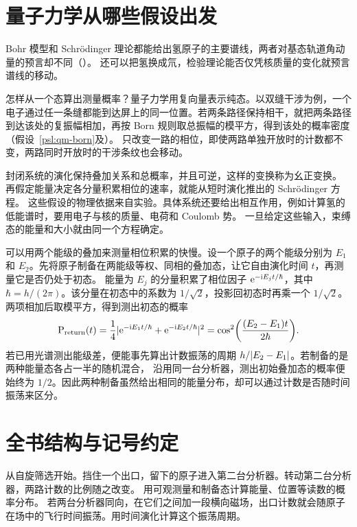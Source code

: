 \section{量子力学从哪些假设出发}
Bohr 模型和 Schrödinger 理论都能给出氢原子的主要谱线，两者对基态轨道角动量的预言却不同（）。
还可以把氢换成氘，检验理论能否仅凭核质量的变化就预言谱线的移动。

怎样从一个态算出测量概率？量子力学用复向量表示纯态。以双缝干涉为例，一个电子通过任一条缝都能到达屏上的同一位置。若两条路径保持相干，就把两条路径到达该处的复振幅相加，再按 Born 规则取总振幅的模平方，得到该处的概率密度（假设~\ref{psl:qm-born}及）。
只改变一路的相位，即使两路单独开放时的计数都不变，两路同时开放时的干涉条纹也会移动。

封闭系统的演化保持叠加关系和总概率，并且可逆，这样的变换称为幺正变换。
再假定能量决定各分量积累相位的速率，就能从短时演化推出的 Schrödinger 方程。
这些假设的物理依据来自实验。具体系统还要给出相互作用，例如计算氢的低能谱时，要用电子与核的质量、电荷和 Coulomb 势。
一旦给定这些输入，束缚态的能量和大小就由同一个方程确定。

可以用两个能级的叠加来测量相位积累的快慢。设一个原子的两个能级分别为 $E_1$ 和 $E_2$。先将原子制备在两能级等权、同相的叠加态，让它自由演化时间 $t$，再测量它是否仍处于初态。
能量为 $E_j$ 的分量积累了相位因子 $\mathop{}\!\mathrm{e}^{-\mathrm{i} E_jt/\hbar}$，其中 $\hbar = h/(2\pi)$。该分量在初态中的系数为 $1/\sqrt{2}$，投影回初态时再乘一个 $1/\sqrt{2}$。两项相加后取模平方，得到测出初态的概率
\begin{equation}\label{eq:qm-two-energy-return}
    \operatorname{P}_{\mathrm{return}}(t)
    = \frac14\lvert\mathop{}\!\mathrm{e}^{-\mathrm{i} E_1t/\hbar} + \mathop{}\!\mathrm{e}^{-\mathrm{i} E_2t/\hbar}\rvert^2
    = \cos^2\biggl(\frac{(E_2 - E_1)t}{2\hbar}\biggr) .
\end{equation}
若已用光谱测出能级差，便能事先算出计数振荡的周期 $h/\lvert E_2 - E_1\rvert$。若制备的是两种能量态各占一半的随机混合，
沿用同一台分析器，测出初始叠加态的概率便始终为 $1/2$。因此两种制备虽然给出相同的能量分布，却可以通过计数是否随时间振荡来区分。

\section{全书结构与记号约定}
\label{sec:roadmap}
从自旋筛选开始。挡住一个出口，留下的原子进入第二台分析器。转动第二台分析器，两路计数的比例随之改变。
用可观测量和制备态计算能量、位置等读数的概率分布。
若两台分析器同向，在它们之间加一段横向磁场，出口计数就会随原子在场中的飞行时间振荡。用时间演化计算这个振荡周期。

